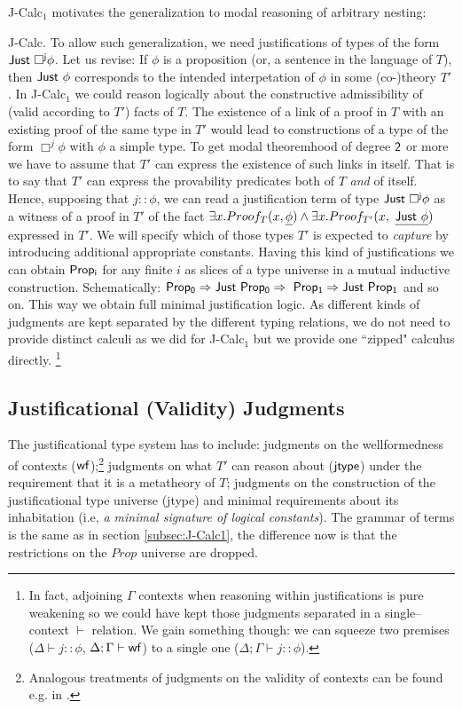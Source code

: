 {\sf J-Calc$_1$} motivates the generalization to modal reasoning of arbitrary nesting: {{\sf J-Calc}. To allow such generalization, we need justifications of types of the form ${\sf Just\  \Box^{j}\phi}$. Let us revise: If $\phi$ is a proposition (or, a sentence in the language of $T$), then ${\sf Just\ \phi}$ corresponds to the intended interpetation of $\phi$ in some (co-)theory $T'$. In {\sf J-Calc$_1$} we could reason logically about the constructive admissibility of (valid according to $T'$) facts of $T$. The existence of a link of a proof in $T$ with an existing proof of the same type in $T'$ would lead to constructions of a type of the form $\Box^{j}\phi$ with $\phi$ a simple type. To get modal theoremhood of degree ${\sf 2}$ or more we have to assume that $T'$ can express the existence of such links in itself. That is to say that $T'$ can express the provability predicates both of $T$ \textit{and} of itself. Hence, supposing that $j::\phi$, we can read a justification term of type ${{\sf Just}\  \Box^{\sf j}\phi}$ as a witness of a proof in $T'$ of the fact $\exists x. Proof_T(x, \underline{\phi}) \wedge \exists x. Proof_{T'}(x, \  \underline{{\sf Just\  \phi}}) $ expressed in $T'$. 
We will specify which of those types $T'$ is expected to \textit{capture} by introducing additional appropriate constants. Having this kind of justifications we can obtain ${\sf Prop_i}$ for any finite $i$ as slices of a type universe in a mutual inductive construction. Schematically: $ {\sf Prop_0\Rightarrow Just \ Prop_0\Rightarrow \ Prop_1 \Rightarrow Just\ Prop_1}$ and so on. This way we obtain full minimal  justification logic. As different kinds of judgments are kept separated by the different typing relations, we do not need to provide distinct calculi as we did for {\sf J-Calc$_1$} but we provide one ``zipped" calculus directly. \footnote {In fact, adjoining $\Gamma$ contexts when reasoning within justifications is pure weakening so we could have kept those judgments separated in a single--context $\vdash$ relation. We gain something though: we can squeeze two premises ($\Delta\vdash j::\phi$, $\Delta;\Gamma\vdash{\sf wf}$) to a single one ($\Delta;\Gamma\vdash j::\phi$).}

\subsection{Justificational (Validity) Judgments}
\label{sec:propjtype1}
The justificational type system has to include: judgments on the wellformedness of contexts ({$\sf wf$});\footnote{ Analogous treatments of judgments on the validity of contexts can be found e.g. in \cite{Norell08dependentlytyped}.} judgments on what $T'$  can reason about ($\sf jtype$)  under the requirement that it is a metatheory of $T$; judgments on the construction of the justificational type universe ({\sf jtype}) and minimal requirements about its inhabitation (i.e, \textit{a  minimal signature of  logical constants}). The grammar of terms is the same as in section \ref{subsec:J-Calc1}, the difference now is that the restrictions on the $Prop$ universe are dropped. 

}

